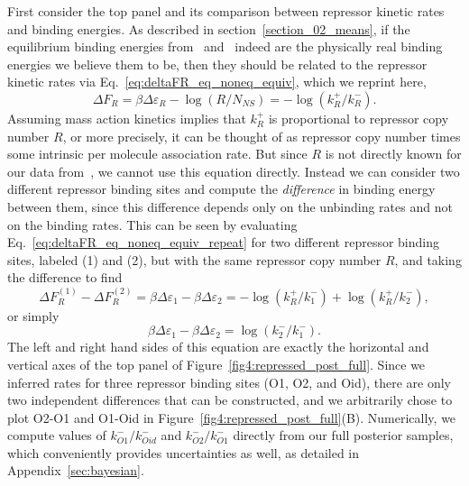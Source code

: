 First consider the top panel and its comparison between repressor
kinetic rates and binding energies.
As described in section~\ref{section_02_means}, if the
equilibrium binding energies from~\cite{Garcia2011a}
and~\cite{Razo-Mejia2018} indeed are the physically real binding
energies we believe them to be, then they should be related to
the repressor kinetic rates via
Eq.~\ref{eq:deltaFR_eq_noneq_equiv}, which we reprint here,
\begin{equation}
\Delta F_R = \beta\Delta\varepsilon_R - \log(R/N_{NS})
        = - \log(k_R^+/k_R^-).
\label{eq:deltaFR_eq_noneq_equiv_repeat}
\end{equation}
Assuming mass action
kinetics implies that $k_R^+$ is proportional to repressor copy
number $R$, or more precisely, it can be thought of as repressor
copy number times some intrinsic per molecule association rate.
But since $R$ is not directly known for our data
from~\cite{Jones2014}, we cannot use this equation directly.
Instead we can consider two different repressor binding sites and
compute the \textit{difference} in binding energy between them,
since this difference depends only on the unbinding rates and not
on the binding rates. This can be seen by evaluating
Eq.~\ref{eq:deltaFR_eq_noneq_equiv_repeat} for two different
repressor binding sites, labeled (1) and (2), but with the same
repressor copy number $R$, and taking the difference to find
\begin{equation}
\Delta F_R^{(1)} - \Delta F_R^{(2)}
= \beta\Delta\varepsilon_1 - \beta\Delta\varepsilon_2
= - \log(k_R^+/k_1^-) + \log(k_R^+/k_2^-),
\end{equation}
or simply
\begin{equation}
\beta\Delta\varepsilon_1 - \beta\Delta\varepsilon_2
= \log(k_2^-/k_1^-).
\end{equation}
The left and right hand sides of this equation are exactly the horizontal
and vertical axes of the top panel of Figure~\ref{fig4:repressed_post_full}.
Since we inferred rates for three repressor binding sites (O1, O2, and Oid),
there are only two independent differences that can be constructed, and we
arbitrarily chose to plot O2-O1 and O1-Oid in
Figure~\ref{fig4:repressed_post_full}(B).
Numerically, we compute values of $k_{O1}^- / k_{Oid}^-$ and
$k_{O2}^- / k_{O1}^-$ directly from our full posterior samples,
which conveniently provides uncertainties as well, as detailed in
Appendix~\ref{sec:bayesian}.
